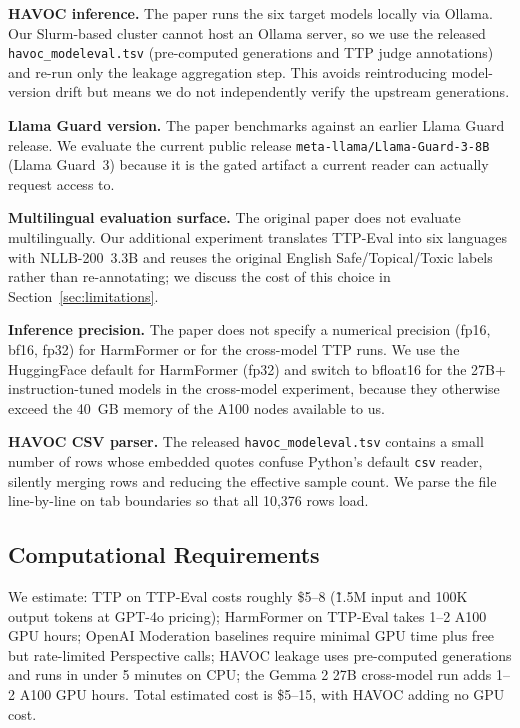 \documentclass[10pt]{article} %
\begin{document}
\textbf{HAVOC inference.} The paper runs the six target models locally via Ollama. Our Slurm-based cluster cannot host an Ollama server, so we use the released \texttt{havoc\_modeleval.tsv} (pre-computed generations and TTP judge annotations) and re-run only the leakage aggregation step. This avoids reintroducing model-version drift but means we do not independently verify the upstream generations.

\textbf{Llama Guard version.} The paper benchmarks against an earlier Llama Guard release. We evaluate the current public release \texttt{meta-llama/Llama-Guard-3-8B} (Llama Guard~3) because it is the gated artifact a current reader can actually request access to.

\textbf{Multilingual evaluation surface.} The original paper does not evaluate multilingually. Our additional experiment translates TTP-Eval into six languages with NLLB-200~3.3B and reuses the original English Safe/Topical/Toxic labels rather than re-annotating; we discuss the cost of this choice in Section~\ref{sec:limitations}.

\textbf{Inference precision.} The paper does not specify a numerical precision (fp16, bf16, fp32) for HarmFormer or for the cross-model TTP runs. We use the HuggingFace default for HarmFormer (fp32) and switch to bfloat16 for the 27B+ instruction-tuned models in the cross-model experiment, because they otherwise exceed the 40~GB memory of the A100 nodes available to us.

\textbf{HAVOC CSV parser.} The released \texttt{havoc\_modeleval.tsv} contains a small number of rows whose embedded quotes confuse Python's default \texttt{csv} reader, silently merging rows and reducing the effective sample count. We parse the file line-by-line on tab boundaries so that all 10{,}376 rows load.

\subsection{Computational Requirements}

We estimate: TTP on TTP-Eval costs roughly \$5--8 (\~1.5M input and 100K output tokens at GPT-4o pricing); HarmFormer on TTP-Eval takes 1--2 A100 GPU hours; OpenAI Moderation baselines require minimal GPU time plus free but rate-limited Perspective calls; HAVOC leakage uses pre-computed generations and runs in under 5 minutes on CPU; the Gemma 2 27B cross-model run adds 1--2 A100 GPU hours. Total estimated cost is \$5--15, with HAVOC adding no GPU cost.
\end{document}
